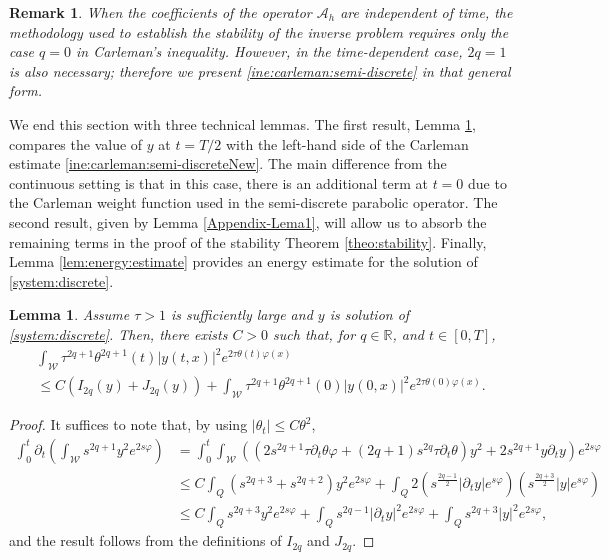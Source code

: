 \documentclass{amsart}
\numberwithin{equation}{section}
\newtheorem{lemma}[theorem]{Lemma}
\newtheorem{remark}[theorem]{Remark}
\begin{document}
\begin{remark}
When the coefficients of the operator $\mathcal{A}_h$ are independent of time, the methodology used to establish the stability of the inverse problem requires only the case $q=0$ in Carleman's inequality. However, in the time-dependent case, $2q=1$ is also necessary; therefore we present \eqref{ine:carleman:semi-discrete} in that general form.
\end{remark}

We end this section with three technical lemmas. The first result, Lemma \ref{lem:T/2}, compares the value of $y$ at $t=T/2$ with the left-hand side of the Carleman estimate \eqref{ine:carleman:semi-discreteNew}. The main difference from the continuous setting is that in this case, there is an additional term at $t=0$ due to the Carleman weight function used in the semi-discrete parabolic operator. The second result, given by Lemma \ref{Appendix-Lema1}, will allow us to absorb the remaining terms in the proof of the stability Theorem \ref{theo:stability}. Finally, Lemma \ref{lem:energy:estimate} provides an energy estimate for the solution of \eqref{system:discrete}.
 
\begin{lemma}\label{lem:T/2} Assume $\tau>1$ is sufficiently large and $y$ is solution of \eqref{system:discrete}. Then, there exists $C>0$ such that, for $q\in\mathbb{R}$, and $t\in[0,T]$,
\begin{multline*}
    \int_{\mathcal{W}}\tau^{2q+1}\theta^{2q+1}\left(t\right)\left|y\left(t,x\right)\right|^2e^{2\tau\theta(t)\varphi(x)}
    \\
    \le C\left(I_{2q}(y)+J_{2q}(y)\right) +\int_{\mathcal{W}} \tau^{2q+1}\theta^{2q+1}(0)\left|y(0,x)\right|^2e^{2\tau\theta(0)\varphi(x)}.
\end{multline*}
\end{lemma}
\begin{proof}
 It suffices to note that, by using $|\theta_t|\le C\theta^2$,
\begin{align*}
\int_0^{t}\partial_t\left(\int_{\mathcal{W}} s^{2q+1}y^2e^{2s\varphi}\right)&
=\int_0^{t}\int_{\mathcal{W}}\left((2s^{2q+1}\tau\partial_{t}\theta\varphi +(2q+1)s^{2q}\tau\partial_{t}\theta)y^2+2s^{2q+1}y\partial_{t}y \right)e^{2s\varphi} \\
&\le C\int_Q(s^{2q+3}+s^{2q+2})y^2e^{2s\varphi}+\int_Q2\left(s^{\frac{2q-1}{2}}|\partial_{t}y |e^{s\varphi}\right)\left(s^{\frac{2q+3}{2}}|y|e^{s\varphi}\right)\\
&\le C\int_Qs^{2q+3}y^2e^{2s\varphi}+\int_Qs^{2q-1}|\partial_{t}y |^2e^{2s\varphi}+\int_Qs^{2q+3}|y|^2e^{2s\varphi},
    \end{align*}
  and the result follows from the definitions of $I_{2q}$ and $J_{2q}$. 
\end{proof}
\end{document}
